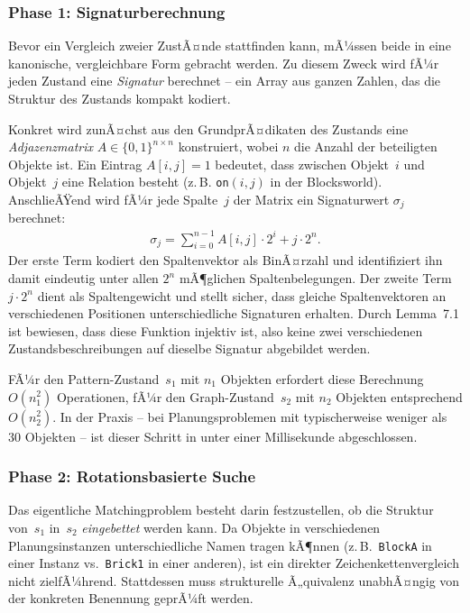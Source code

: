 ﻿\documentclass[a4paper,12pt]{article}
\theoremstyle{definition}
\begin{document}
\subsubsection*{Phase 1: Signaturberechnung}

Bevor ein Vergleich zweier ZustÃ¤nde stattfinden kann, mÃ¼ssen beide in eine kanonische, vergleichbare Form gebracht werden. Zu diesem Zweck wird fÃ¼r jeden Zustand eine \emph{Signatur} berechnet -- ein Array aus ganzen Zahlen, das die Struktur des Zustands kompakt kodiert.

Konkret wird zunÃ¤chst aus den GrundprÃ¤dikaten des Zustands eine \emph{Adjazenzmatrix} $A \in \{0,1\}^{n \times n}$ konstruiert, wobei $n$ die Anzahl der beteiligten Objekte ist. Ein Eintrag $A[i,j] = 1$ bedeutet, dass zwischen Objekt~$i$ und Objekt~$j$ eine Relation besteht (z.\,B. \texttt{on}$(i,j)$ in der Blocksworld). AnschlieÃŸend wird fÃ¼r jede Spalte~$j$ der Matrix ein Signaturwert $\sigma_j$ berechnet:
\begin{align}
  \sigma_j = \sum_{i=0}^{n-1} A[i,j] \cdot 2^i + j \cdot 2^n.
\end{align}
Der erste Term kodiert den Spaltenvektor als BinÃ¤rzahl und identifiziert ihn damit eindeutig unter allen $2^n$ mÃ¶glichen Spaltenbelegungen. Der zweite Term $j \cdot 2^n$ dient als Spaltengewicht und stellt sicher, dass gleiche Spaltenvektoren an verschiedenen Positionen unterschiedliche Signaturen erhalten. Durch Lemma~7.1 ist bewiesen, dass diese Funktion injektiv ist, also keine zwei verschiedenen Zustandsbeschreibungen auf dieselbe Signatur abgebildet werden.

FÃ¼r den Pattern-Zustand~$s_1$ mit $n_1$ Objekten erfordert diese Berechnung $O(n_1^2)$ Operationen, fÃ¼r den Graph-Zustand~$s_2$ mit $n_2$ Objekten entsprechend $O(n_2^2)$. In der Praxis -- bei Planungsproblemen mit typischerweise weniger als 30 Objekten -- ist dieser Schritt in unter einer Millisekunde abgeschlossen.

\subsubsection*{Phase 2: Rotationsbasierte Suche}

Das eigentliche Matchingproblem besteht darin festzustellen, ob die Struktur von~$s_1$ in~$s_2$ \emph{eingebettet} werden kann. Da Objekte in verschiedenen Planungsinstanzen unterschiedliche Namen tragen kÃ¶nnen (z.\,B.\ \texttt{BlockA} in einer Instanz vs.\ \texttt{Brick1} in einer anderen), ist ein direkter Zeichenkettenvergleich nicht zielfÃ¼hrend. Stattdessen muss strukturelle Ã„quivalenz unabhÃ¤ngig von der konkreten Benennung geprÃ¼ft werden.
\end{document}
